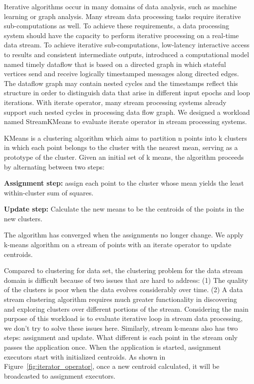 Iterative algorithms occur in many domains of data analysis, such as machine learning or graph analysis. Many stream data processing tasks require iterative sub-computations as well. To achieve these requirements, a data processing system should have the capacity to perform iterative processing on a real-time data stream. To achieve iterative sub-computations,  low-latency interactive access to results and consistent intermediate outputs, \citeauthor{murray2013naiad} introduced a computational model named timely dataflow that is based on a directed graph in which stateful vertices send and receive logically timestamped messages along directed edges. \cite{murray2013naiad} The dataflow graph may contain nested cycles and the timestamps reflect this structure in order to distinguish data that arise in different input epochs and loop iterations. With iterate operator, many stream processing systems already support such nested cycles in processing data flow graph. We designed a workload named StreamKMeans to evaluate iterate operator in stream processing systems.

KMeans is a clustering algorithm which aims to partition n points into k clusters in which each point belongs to the cluster with the nearest mean, serving as a prototype of the cluster.\cite{kmeans_wiki} Given an initial set of k means, the algorithm proceeds by alternating between two steps: \cite{mackay2003information}
\begin{description}
\item\textbf{Assignment step:} assign each point to the cluster whose mean yields the least within-cluster sum of squares.
\item \textbf{Update step:} Calculate the new means to be the centroids of the points in the new clusters.
\end{description}

The algorithm has converged when the assignments no longer change. We apply k-means algorithm on a stream of points with an iterate operator to update centroids.

Compared to clustering for data set, the clustering problem for the data stream domain is difficult because of two issues that are hard to address: (1) The quality of the clusters is poor when the data evolves considerably over time. (2) A data stream clustering algorithm requires much greater functionality in discovering and exploring clusters over different portions of the stream.\cite{aggarwal2003framework} Considering the main purpose of this workload is to evaluate iterative loop in stream data processing, we don't try to solve these issues here. Similarly, stream k-means also has two steps: assignment and update. What different is each point in the stream only passes the application once. When the application is started, assignment executors start with initialized centroids. As shown in Figure~\ref{fig:iterator_operator}, once a new centroid calculated, it will be broadcasted to assignment executors. 

